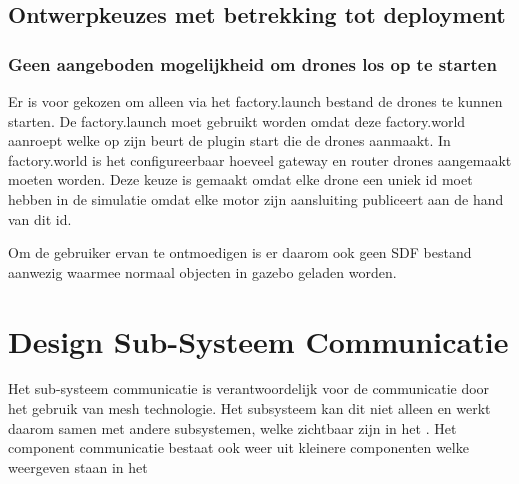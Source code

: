 \documentclass[a4paper, 11pt, oneside]{report}
\begin{document}
\subsection{Ontwerpkeuzes met betrekking tot deployment}
\label{DetailedDesign:deployment:decisisions}

\subsubsection{Geen aangeboden mogelijkheid om drones los op te starten}
Er is voor gekozen om alleen via het factory.launch bestand de drones te kunnen starten. 
De factory.launch moet gebruikt worden omdat deze factory.world aanroept welke op zijn beurt de plugin start die de drones aanmaakt.  
In factory.world is het configureerbaar hoeveel gateway en router drones aangemaakt moeten worden.
Deze keuze is gemaakt omdat elke drone een uniek id moet hebben in de simulatie omdat elke motor zijn aansluiting publiceert aan de hand van dit id.

Om de gebruiker ervan te ontmoedigen is er daarom ook geen SDF bestand aanwezig waarmee normaal objecten in gazebo geladen worden. 

\section{Design Sub-Systeem Communicatie}
Het sub-systeem communicatie is verantwoordelijk voor de communicatie door het gebruik van mesh technologie.
Het subsysteem kan dit niet alleen en werkt daarom samen met andere subsystemen, welke zichtbaar zijn in het  .
Het component communicatie bestaat ook weer uit kleinere componenten welke weergeven staan in het 
  
\label{DetailedDesign:Communicatie}
\end{document}
